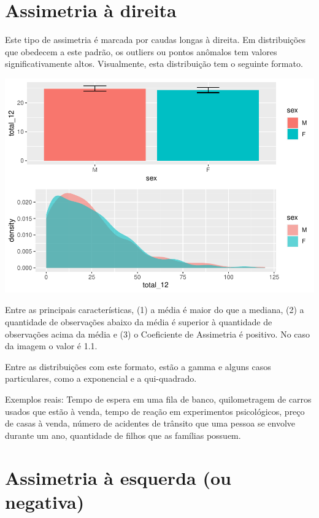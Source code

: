 \documentclass[
]{book}
\begin{document}
\hypertarget{assimetria-uxe0-direita}{%
\section{Assimetria à direita}\label{assimetria-uxe0-direita}}

Este tipo de assimetria é marcada por caudas longas à direita. Em distribuições que obedecem a este padrão, os outliers ou pontos anômalos tem valores significativamente altos. Visualmente, esta distribuição tem o seguinte formato.

\begin{center}\includegraphics{gitbook-demo_files/figure-latex/unnamed-chunk-32-1} \end{center}

Entre as principais características, (1) a média é maior do que a mediana, (2) a quantidade de observações abaixo da média é superior à quantidade de observações acima da média e (3) o Coeficiente de Assimetria é positivo. No caso da imagem o valor é 1.1.

Entre as distribuições com este formato, estão a gamma e alguns casos particulares, como a exponencial e a qui-quadrado.

Exemplos reais: Tempo de espera em uma fila de banco, quilometragem de carros usados que estão à venda, tempo de reação em experimentos psicológicos, preço de casas à venda, número de acidentes de trânsito que uma pessoa se envolve durante um ano, quantidade de filhos que as famílias possuem.

\hypertarget{assimetria-uxe0-esquerda-ou-negativa}{%
\section{Assimetria à esquerda (ou negativa)}\label{assimetria-uxe0-esquerda-ou-negativa}}
\end{document}
